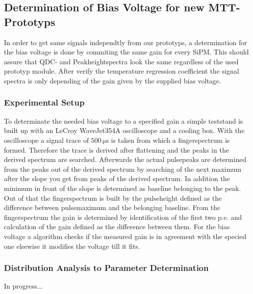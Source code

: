 \subsection{Determination of Bias Voltage for new MTT-Prototyps}
\label{sipmVoltDetermination}
In order to get same signals independtly from our prototyps, a determination for the bias voltage is done by commiting the same gain for every SiPM. This should assure that QDC- and Peakheightspectra look the same regardless of the used prototyp module. After verify the temperature regression coefficient the signal spectra is only depending of the gain given by the supplied bias voltage.

\subsubsection{Experimental Setup}
To determinate the needed bias voltage to a specified gain a simple teststand is built up with an LeCroy WaveJet354A oscilloscope and a cooling box. With the oscilloscope a signal trace of $500\,\mathrm{\mu s}$ is taken from which a fingerspectrum is formed. Therefore the trace is derived after flattening and the peaks in the derived spectrum are searched. Afterwards the actual pulsepeaks are determined from the peaks out of the derived spectrum by searching of the next maximum after the slope you get from peaks of the derived spectrum. 
In addition the minimum in front of the slope is determined as baseline belonging to the peak. Out of that the fingerspectrum is built by the pulseheight defined as the difference between pulsemaximum and the belonging baseline.
From the fingerspectrum the gain is determined by identification of the first two p.e. and calculation of the gain defined as the difference between them. For the bias voltage a algorithm checks if the measured gain is in agreement with the specied one elsewise it modifies the voltage till it fits.

\subsubsection{Distribution Analysis to Parameter Determination}
In progress...    
